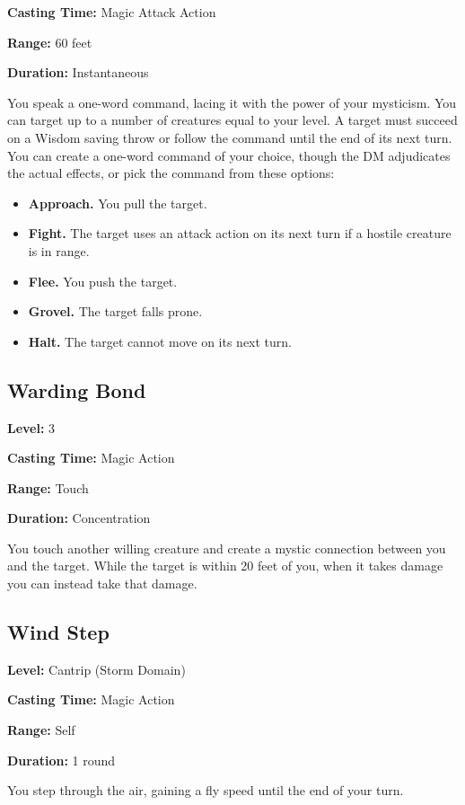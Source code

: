 \documentclass[12pt,letterpaper,twocolumn,openany,nodeprecatedcode,bg=none]{dndbook}
\providecommand{\tightlist}{%
  \setlength{\itemsep}{0pt}\setlength{\parskip}{0pt}}
\begin{document}
\textbf{Casting Time:} Magic Attack Action

\textbf{Range:} 60 feet

\textbf{Duration:} Instantaneous

You speak a one-word command, lacing it with the power of your
mysticism. You can target up to a number of creatures equal to your
level. A target must succeed on a Wisdom saving throw or follow the
command until the end of its next turn. You can create a one-word
command of your choice, though the DM adjudicates the actual effects, or
pick the command from these options:

\begin{itemize}
\tightlist
\item
  \textbf{Approach.} You pull the target.
\item
  \textbf{Fight.} The target uses an attack action on its next turn if a
  hostile creature is in range.
\item
  \textbf{Flee.} You push the target.
\item
  \textbf{Grovel.} The target falls prone.
\item
  \textbf{Halt.} The target cannot move on its next turn.
\end{itemize}

\subsection{Warding Bond}\label{warding-bond}

\textbf{Level:} 3

\textbf{Casting Time:} Magic Action

\textbf{Range:} Touch

\textbf{Duration:} Concentration

You touch another willing creature and create a mystic connection
between you and the target. While the target is within 20 feet of you,
when it takes damage you can instead take that damage.

\subsection{Wind Step}\label{wind-step}

\textbf{Level:} Cantrip (Storm Domain)

\textbf{Casting Time:} Magic Action

\textbf{Range:} Self

\textbf{Duration:} 1 round

You step through the air, gaining a fly speed until the end of your
turn.
\end{document}
